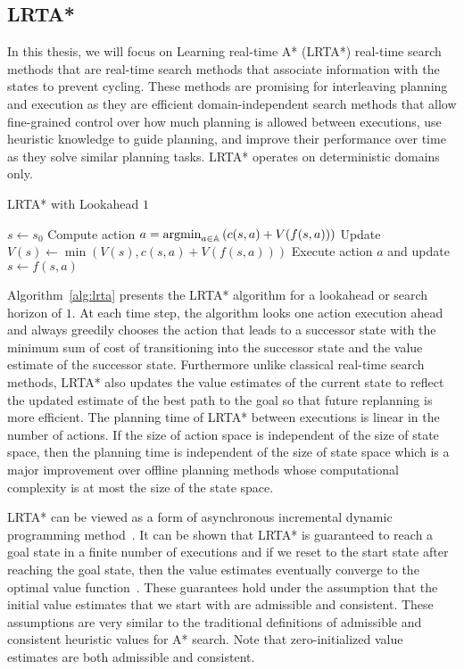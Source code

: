 \subsection{LRTA*}
\label{sec:lrta}

In this thesis, we will focus on Learning real-time A* (LRTA*) real-time search methods
that are real-time search methods that associate information with the
states to prevent cycling. These methods are promising for
interleaving planning and execution as they are efficient
domain-independent search methods that allow fine-grained control over
how much planning is allowed between executions, use heuristic
knowledge to guide planning, and improve their performance over time
as they solve similar planning tasks. LRTA* operates on deterministic
domains only.

\begin{algorithm}[t]
  \caption{LRTA* with Lookahead $1$~\cite{DBLP:journals/ai/Korf90}}
  \begin{algorithmic}[1]
    \State $s \leftarrow s_0$
    \State Compute action $a = \operatorname*{argmin}_{a \in \mathbb{A}} \left( c(s, a) +
      V(f(s, a)) \right)$
    \State Update $V(s) \leftarrow \min\left( V(s), c(s, a) + V(f(s,
      a)) \right)$
    \State Execute action $a$ and update $s \leftarrow f(s, a)$
    \EndWhile
  \end{algorithmic}
  \label{alg:lrta}
\end{algorithm}

Algorithm~\ref{alg:lrta} presents the LRTA* algorithm for a lookahead
or search horizon of $1$. At each time step, the algorithm looks one
action execution ahead and always greedily chooses the action that
leads to a successor state with the minimum sum of cost of
transitioning into the successor state and the value estimate of the
successor state. Furthermore unlike classical real-time search
methods, LRTA* also updates the value estimates of the current state
to reflect the updated estimate of the best path to the goal so that
future replanning is more efficient. The planning time of LRTA*
between executions is linear in the number of actions. If the size of
action space is independent of the size of state space, then the
planning time is independent of the size of state space which is a
major improvement over offline planning methods whose computational
complexity is at most the size of the state space.

LRTA* can be viewed as a form of asynchronous incremental dynamic
programming method~\cite{DBLP:journals/ai/BartoBS95}. It can be shown
that LRTA* is guaranteed to reach a goal state in a finite number of
executions and if we reset to the start state after reaching the goal
state, then the value estimates eventually converge to the optimal
value function~\cite{DBLP:journals/ai/Korf90}. These guarantees hold
under the assumption that the initial value estimates that we start
with are admissible and consistent. These assumptions are very similar
to the traditional definitions of admissible and consistent heuristic
values for A* search. Note that zero-initialized value estimates are
both admissible and consistent.

